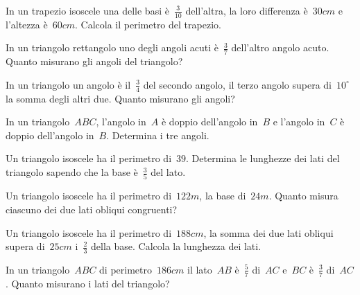 \begin{multicols}{2}
\begin{esercizio}[\Ast]
\label{ese:16.110}
In un trapezio isoscele una delle basi è~$\frac{3}{10}$ dell'altra, la loro differenza è~$30\unit{cm}$ e l'altezza è~$60\unit{cm}$. Calcola il perimetro del trapezio.
\end{esercizio}

\begin{esercizio}[\Ast]
\label{ese:16.111}
In un triangolo rettangolo uno degli angoli acuti è~$\frac{3}{7}$ dell'altro angolo acuto. Quanto misurano gli angoli del triangolo?
\end{esercizio}

\begin{esercizio}[\Ast]
\label{ese:16.112}
In un triangolo un angolo è il~$\frac{3}{4}$ del secondo angolo, il terzo angolo supera di~$10^{\circ}$ la somma degli altri due. Quanto misurano gli angoli?
\end{esercizio}

\begin{esercizio}
\label{ese:16.113}
In un triangolo~$ABC$, l'angolo in~$A$ è doppio dell'angolo in~$B$ e l'angolo in~$C$ è doppio dell'angolo in~$B$. Determina i tre angoli.
\end{esercizio}

\begin{esercizio}
\label{ese:16.114}
Un triangolo isoscele ha il perimetro di~$39$. Determina le lunghezze dei lati del triangolo sapendo che la base è~$\frac{3}{5}$ del lato.
\end{esercizio}

\begin{esercizio}[\Ast]
\label{ese:16.115}
Un triangolo isoscele ha il perimetro di~$122\unit{m}$, la base di~$24\unit{m}$. Quanto misura ciascuno dei due lati obliqui congruenti?
\end{esercizio}

\begin{esercizio}[\Ast]
\label{ese:16.116}
Un triangolo isoscele ha il perimetro di~$188\unit{cm}$, la somma dei due lati obliqui supera di~$25\unit{cm}$ i~$\frac{2}{3}$ della base. Calcola la lunghezza dei lati.
\end{esercizio}

\begin{esercizio}[\Ast]
\label{ese:16.117}
In un triangolo~$ABC$ di perimetro~$186\unit{cm}$ il lato~$AB$ è~$\frac{5}{7}$ di~$AC$ e~$BC$ è~$\frac{3}{7}$ di~$AC$. Quanto misurano i lati del triangolo?
\end{esercizio}


\end{multicols}
